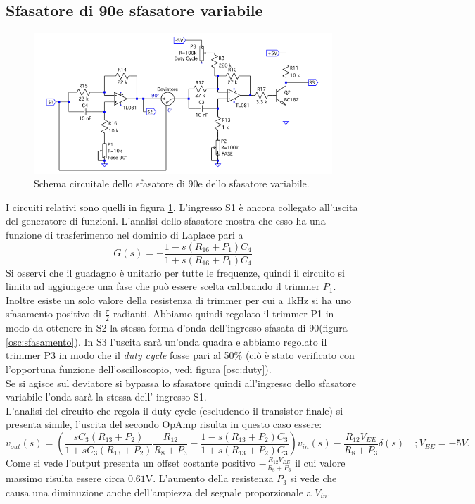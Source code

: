 \documentclass[10pt,a4paper]{article}
\begin{document}
\newpage

\subsection{Sfasatore di 90\degree e sfasatore variabile}

\begin{figure}[!htb]
  \centering
  \includegraphics[scale=0.75]{sfasatori.png}
\caption{Schema circuitale dello sfasatore di 90\degree e dello sfasatore variabile.\label{fig:sfasatori}}
\end{figure}
I circuiti relativi sono quelli in figura \ref{fig:sfasatori}. L'ingresso S1 è ancora collegato all'uscita del generatore di funzioni.
L'analisi dello sfasatore mostra che esso ha una funzione di trasferimento nel dominio di Laplace pari a
\begin{equation}
 G(s) = -\frac{1-s(R_{16} +P_1) C_{4}}{1+s(R_{16} + P_1)C_{4}}
\end{equation}
Si osservi che il guadagno è unitario per tutte le frequenze, quindi il circuito si limita ad aggiungere una fase che può essere scelta calibrando il trimmer $P_1$. Inoltre esiste un solo valore della resistenza di trimmer per cui a $1$kHz si ha uno sfasamento positivo di $\frac{\pi}{2}$ radianti. Abbiamo quindi regolato il trimmer P1 in modo da ottenere in S2 la stessa forma d'onda dell'ingresso sfasata di 90\degree (figura \ref{osc:sfasamento}). In S3 l'uscita sarà un'onda quadra e abbiamo regolato il trimmer P3 in modo che il \emph{duty cycle} fosse pari al 50\% (ciò è stato verificato con l'opportuna funzione dell'oscilloscopio, vedi figura \ref{osc:duty}).\\
Se si agisce sul deviatore si bypassa lo sfasatore quindi all'ingresso dello sfasatore variabile l'onda sarà la stessa dell' ingresso S1.\\
L'analisi del circuito che regola il duty cycle (escludendo il transistor finale) si presenta simile, l'uscita del secondo OpAmp risulta in questo caso essere:
\begin{equation}
v_{out}(s) = \left( \frac{s C_3 (R_{13} + P_2)}{1 + s C_3 (R_{13} + P_2)} \frac{R_{12}}{R_8+P_3} -\frac{1-s(R_{13} +P_2) C_{3}}{1+s(R_{13} + P_2)C_{3}} \right) v_{in}(s)-\frac{R_{12} V_{EE}}{R_8+P_3} \delta (s)
\, \, \, \, \, \, ; V_{EE} = -5V.
\end{equation}
Come si vede l'output presenta un offset costante positivo $-\frac{R_{12} V_{EE}}{R_8+P_3}$ il cui valore massimo risulta essere circa $0.61$V. L'aumento della resistenza $P_3$ si vede che causa una diminuzione anche dell'ampiezza del segnale proporzionale a $V_{in}$. 
\end{document}
